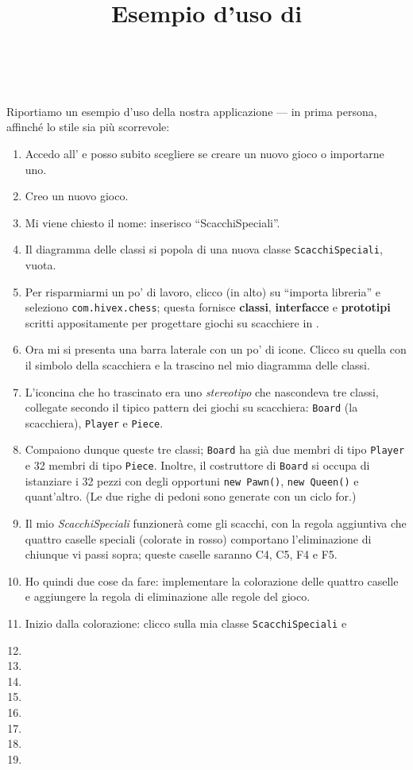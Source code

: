 \documentclass[a4paper]{article}
\title{Esempio d'uso di \proj}
\author{\LB\\\GG}
\date{}
\begin{document}
\maketitle

Riportiamo un esempio d'uso della nostra applicazione --- in prima persona, affinché lo stile sia più scorrevole:
\begin{enumerate}
	\item Accedo all' e posso subito scegliere se creare un nuovo gioco o importarne uno.
	\item Creo un nuovo gioco.
	\item Mi viene chiesto il nome: inserisco “ScacchiSpeciali”.
	\item Il diagramma delle classi si popola di una nuova classe \texttt{ScacchiSpeciali}, vuota.
	\item Per risparmiarmi un po' di lavoro, clicco (in alto) su “importa libreria” e seleziono \texttt{com.hivex.chess}; questa fornisce \textbf{classi}, \textbf{interfacce} e \textbf{prototipi} scritti appositamente per progettare giochi su scacchiere in \proj.
	\item Ora mi si presenta una barra laterale con un po' di icone. Clicco su quella con il simbolo della scacchiera e la trascino nel mio diagramma delle classi.
	\item L'iconcina che ho trascinato era uno \emph{stereotipo} che nascondeva tre classi, collegate secondo il tipico pattern dei giochi su scacchiera: \texttt{Board} (la scacchiera), \texttt{Player} e \texttt{Piece}.
	\item Compaiono dunque queste tre classi; \texttt{Board} ha già due membri di tipo \texttt{Player} e 32 membri di tipo \texttt{Piece}. Inoltre, il costruttore di \texttt{Board} si occupa di istanziare i 32 pezzi con degli opportuni \texttt{new Pawn()}, \texttt{new Queen()} e quant'altro. (Le due righe di pedoni sono generate con un ciclo for.)
	\item Il mio \emph{ScacchiSpeciali} funzionerà come gli scacchi, con la regola aggiuntiva che quattro caselle speciali (colorate in rosso) comportano l'eliminazione di chiunque vi passi sopra; queste caselle saranno C4, C5, F4 e F5.
	\item Ho quindi due cose da fare: implementare la colorazione delle quattro caselle e aggiungere la regola di eliminazione alle regole del gioco.
	\item Inizio dalla colorazione: clicco sulla mia classe \texttt{ScacchiSpeciali} e 
	\item 
	\item 
	\item 
	\item 
	\item 
	\item 
	\item 
	\item 
\end{enumerate}
\end{document}

